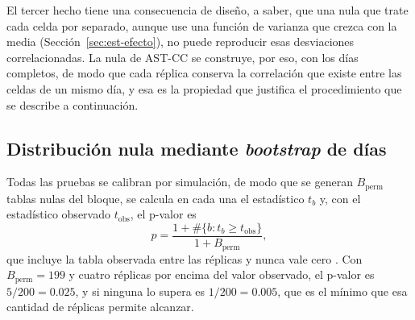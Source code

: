 El tercer hecho tiene una consecuencia de diseño, a saber, que una nula que trate cada celda
por separado, aunque use una función de varianza que crezca con la media
(Sección~\ref{sec:est-efecto}), no puede reproducir esas desviaciones
correlacionadas. La nula de AST-CC se construye, por eso, con los días
completos, de modo que cada réplica conserva la correlación que existe entre las
celdas de un mismo día, y esa es la propiedad que justifica el procedimiento que
se describe a continuación.

\subsection{Distribución nula mediante \emph{bootstrap} de días}\label{sec:prop-bootstrap}

Todas las pruebas se calibran por simulación, de modo que se generan $B_{\mathrm{perm}}$
tablas nulas del bloque, se calcula en cada una el estadístico $t_b$ y, con el
estadístico observado $t_{\mathrm{obs}}$, el p-valor es
\begin{equation}\label{eq:prop-pval}
  p = \frac{1 + \#\{b : t_b \ge t_{\mathrm{obs}}\}}{1 + B_{\mathrm{perm}}},
\end{equation}
que incluye la tabla observada entre las réplicas y nunca vale cero
\cite{Phipson2010}. Con $B_{\mathrm{perm}}=199$ y cuatro réplicas por encima del
valor observado, el p-valor es $5/200 = 0.025$, y si ninguna lo supera es
$1/200 = 0.005$, que es el mínimo que esa cantidad de réplicas permite alcanzar.

